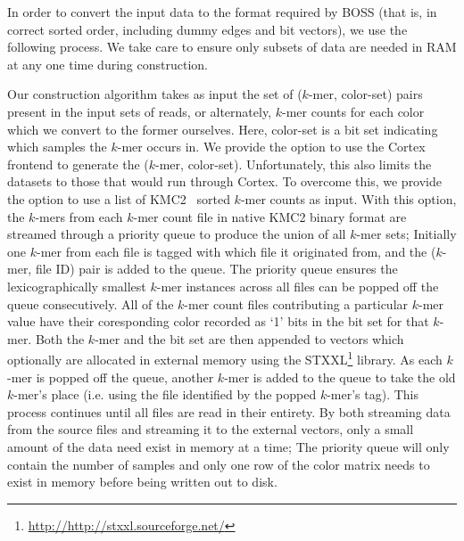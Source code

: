 
In order to convert the input data to the format required by BOSS (that is, in correct sorted order, including dummy edges and bit vectors), we use the following process.  We take care to ensure only subsets of data are needed in RAM at any one time during construction.


Our construction algorithm takes as input the set of ($k$-mer, color-set) pairs present in the input sets of reads, or alternately, $k$-mer counts for each color which we convert to the former ourselves.
Here, color-set is a bit set indicating which samples the $k$-mer occurs in.
We provide the option to use the {\sc Cortex} frontend to generate the ($k$-mer, color-set). Unfortunately, this also limits the datasets to those that would run through {\sc Cortex}.  To overcome this, we provide the option to use a list of KMC2~\citep{KMC2} sorted $k$-mer counts as input.  With this option, the $k$-mers from each $k$-mer count file in native KMC2 binary format are streamed through a priority queue to produce the union of all $k$-mer sets; Initially one $k$-mer from each file is tagged with  which file it originated from, and the ($k$-mer, file ID) pair is added to the queue.   The priority queue ensures the lexicographically smallest $k$-mer instances across all files can be popped off the queue consecutively.  All of the $k$-mer count files contributing a particular $k$-mer value have their coresponding color recorded as `1' bits in the bit set for that $k$-mer.  Both the $k$-mer and the bit set are then appended to vectors which optionally are allocated in external memory using the STXXL\footnote{\url{http://http://stxxl.sourceforge.net/}} library.   As each $k$-mer is popped off the queue, another $k$-mer is added to the queue to take the old $k$-mer's place (i.e. using the file identified by the popped $k$-mer's tag).  This process continues until all files are read in their entirety.  By both streaming data from the source files and streaming it to the external vectors, only a small amount of the data need exist in memory at a time; The priority queue will only contain the number of samples and only one row of the color matrix needs to exist in memory before being written out to disk.

